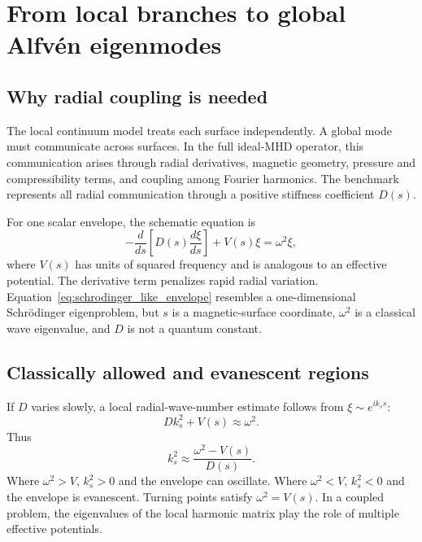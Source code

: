 \section{From local branches to global Alfv\'en eigenmodes}
\label{sec:global_modes}

\subsection{Why radial coupling is needed}
The local continuum model treats each surface independently. A global mode must communicate across surfaces. In the full ideal-MHD operator, this communication arises through radial derivatives, magnetic geometry, pressure and compressibility terms, and coupling among Fourier harmonics. The benchmark represents all radial communication through a positive stiffness coefficient $D(s)$.

For one scalar envelope, the schematic equation is
\begin{equation}
-\frac{d}{ds}\left[D(s)\frac{d\xi}{ds}\right]+V(s)\xi=\omega^2\xi,
\label{eq:schrodinger_like_envelope}
\end{equation}
where $V(s)$ has units of squared frequency and is analogous to an effective potential. The derivative term penalizes rapid radial variation. Equation~\eqref{eq:schrodinger_like_envelope} resembles a one-dimensional Schr\"odinger eigenproblem, but $s$ is a magnetic-surface coordinate, $\omega^2$ is a classical wave eigenvalue, and $D$ is not a quantum constant.

\subsection{Classically allowed and evanescent regions}
If $D$ varies slowly, a local radial-wave-number estimate follows from $\xi\sim e^{ik_ss}$:
\begin{equation}
Dk_s^2+V(s)\approx\omega^2.
\end{equation}
Thus
\begin{equation}
k_s^2\approx\frac{\omega^2-V(s)}{D(s)}.
\label{eq:radial_wkb}
\end{equation}
Where $\omega^2>V$, $k_s^2>0$ and the envelope can oscillate. Where $\omega^2<V$, $k_s^2<0$ and the envelope is evanescent. Turning points satisfy $\omega^2=V(s)$. In a coupled problem, the eigenvalues of the local harmonic matrix play the role of multiple effective potentials.

